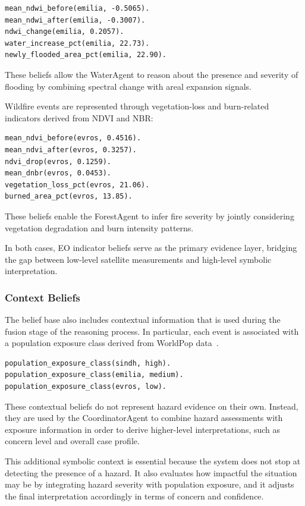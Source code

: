 \documentclass[12pt]{article}
\begin{document}
\begin{lstlisting}
mean_ndwi_before(emilia, -0.5065).
mean_ndwi_after(emilia, -0.3007).
ndwi_change(emilia, 0.2057).
water_increase_pct(emilia, 22.73).
newly_flooded_area_pct(emilia, 22.90).
\end{lstlisting}

These beliefs allow the WaterAgent to reason about the presence and severity of flooding by combining spectral change with areal expansion signals.

Wildfire events are represented through vegetation-loss and burn-related indicators derived from NDVI and NBR:

\begin{lstlisting}
mean_ndvi_before(evros, 0.4516).
mean_ndvi_after(evros, 0.3257).
ndvi_drop(evros, 0.1259).
mean_dnbr(evros, 0.0453).
vegetation_loss_pct(evros, 21.06).
burned_area_pct(evros, 13.85).
\end{lstlisting}

These beliefs enable the ForestAgent to infer fire severity by jointly considering vegetation degradation and burn intensity patterns.

In both cases, EO indicator beliefs serve as the primary evidence layer, bridging the gap between low-level satellite measurements and high-level symbolic interpretation.

\subsubsection{Context Beliefs}

The belief base also includes contextual information that is used during the fusion stage of the reasoning process. In particular, each event is associated with a population exposure class derived from WorldPop data~\cite{worldpop2025}.

\begin{lstlisting}
population_exposure_class(sindh, high).
population_exposure_class(emilia, medium).
population_exposure_class(evros, low).
\end{lstlisting}

These contextual beliefs do not represent hazard evidence on their own. Instead, they are used by the CoordinatorAgent to combine hazard assessments with exposure information in order to derive higher-level interpretations, such as concern level and overall case profile.

This additional symbolic context is essential because the system does not stop at detecting the presence of a hazard. It also evaluates how impactful the situation may be by integrating hazard severity with population exposure, and it adjusts the final interpretation accordingly in terms of concern and confidence.
\end{document}
